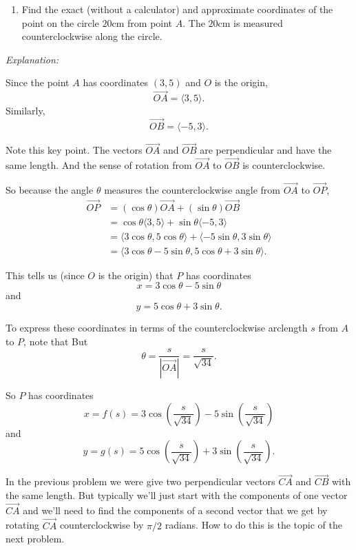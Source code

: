 \documentclass{ximera}
\begin{document}
\begin{question}
\begin{enumerate}
\item Find the exact (without a calculator) and approximate coordinates of the point on the circle $20$cm from point $A$. The $20$cm is measured counterclockwise along the circle.
\end{enumerate}

\emph{Explanation:}

Since the point $A$ has coordinates $(3,5)$ and $O$ is the origin,
\[
    \overrightarrow{OA} = \langle 3, 5 \rangle.
\]
Similarly,
\[
    \overrightarrow{OB} = \langle -5,3 \rangle.
\]

Note this key point. The vectors $\overrightarrow{OA}$ and $\overrightarrow{OB}$ are perpendicular and have the same length. And the sense of rotation from $\overrightarrow{OA}$ to $\overrightarrow{OB}$ is counterclockwise.

So because the angle $\theta$ measures the counterclockwise angle from $\overrightarrow{OA}$ to $\overrightarrow{OP}$,
\begin{align*}
  \overrightarrow{OP} &= (\cos \theta) \overrightarrow{OA} + (\sin\theta) \overrightarrow{OB} \\
                                 &=\cos\theta \langle 3, 5 \rangle + \sin \theta \langle -5, 3 \rangle \\
                                 &=\langle 3 \cos\theta , 5\cos\theta \rangle + \langle -5\sin \theta, 3 \sin\theta \rangle \\
                                 &= \langle 3 \cos\theta - 5\sin\theta , 5\cos\theta + 3\sin\theta \rangle.
\end{align*}

This tells us (since $O$ is the origin) that $P$ has coordinates
\[
  x = 3 \cos\theta - 5\sin\theta
\]
and
\[ 
    y = 5\cos\theta + 3\sin\theta .
\]

To express these coordinates in terms of the counterclockwise arclength $s$ from $A$ to $P$, note that
But 
\[
  \theta =    \frac{s}{\left|  \overrightarrow{OA} \right|}  = \frac{s}{\sqrt{34}} .
\]

So $P$ has coordinates
\[
      x = f(s) = 3 \cos\left( \frac{s}{\sqrt{34}} \right) - 5\sin\left( \frac{s}{\sqrt{34}} \right)
\]
and
\[
      y = g(s) = 5 \cos\left( \frac{s}{\sqrt{34}} \right) +3\sin\left( \frac{s}{\sqrt{34}} \right) .
\]
 

\end{question}

In the previous problem we were give two perpendicular vectors $\overrightarrow{CA}$ and $\overrightarrow{CB}$ with the same length. But typically we'll just start with the components of one vector $\overrightarrow{CA}$ and we'll need to find the components of a second vector that we get by rotating $\overrightarrow{CA}$ counterclockwise by $\pi/2$ radians. How to do this is the topic of the next problem.
\end{document}
